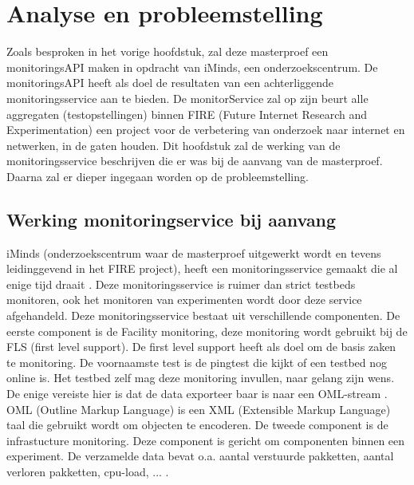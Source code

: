 \newpage
\chapter{Analyse en probleemstelling}
{\samenvatting
Zoals besproken in het vorige hoofdstuk, zal deze masterproef een monitoringsAPI maken in opdracht van iMinds, een onderzoekscentrum. De monitoringsAPI heeft als doel de resultaten van een achterliggende monitoringsservice aan te bieden. De monitorService zal op zijn beurt alle aggregaten (testopstellingen) binnen FIRE (Future Internet Research and Experimentation)  een project voor de verbetering van onderzoek naar internet en netwerken, in de gaten houden. Dit hoofdstuk zal de werking van de monitoringsservice beschrijven die er was bij de aanvang van de masterproef. Daarna zal er dieper ingegaan worden op de probleemstelling.}
\section{Werking monitoringservice bij aanvang}
\npar
iMinds (onderzoekscentrum waar de masterproef uitgewerkt wordt en tevens leidinggevend in het FIRE project), heeft een monitoringsservice gemaakt die al enige tijd draait \citep{fed4fire-second-fed-arch}. Deze monitoringsservice is ruimer dan strict testbeds monitoren, ook het monitoren van experimenten wordt door deze service afgehandeld\citep{fed4fire-second-fed-arch}. 
\npar
Deze monitoringsservice bestaat uit verschillende componenten. De eerste component is de Facility monitoring, deze monitoring wordt gebruikt bij de FLS (first level support). De first level support heeft als doel om de basis zaken te monitoring. De voornaamste test is de pingtest die kijkt of een testbed nog online is. Het testbed zelf mag deze monitoring invullen, naar gelang zijn wens. De enige vereiste hier is dat de data exporteer baar is naar een OML-stream . OML (Outline Markup Language) is een XML (Extensible Markup Language) taal die gebruikt wordt om objecten te encoderen.
\clearpage
\npar
De tweede component is de infrastucture monitoring. Deze component is gericht om componenten binnen een experiment. De verzamelde data bevat o.a. aantal verstuurde pakketten, aantal verloren pakketten, cpu-load, ... .

